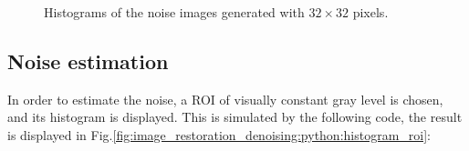 \begin{figure}[ht]
 \centering\caption{Histograms of the noise images generated with $32\times 32$ pixels.}%
 \hfill
 
 \hfill
 \label{fig:image_restoration_denoising:python:histograms}%
\end{figure}


\subsection{Noise estimation}
In order to estimate the noise, a ROI of visually constant gray level is chosen, and its histogram is displayed. This is simulated by the following code, the result is displayed in Fig.\ref{fig:image_restoration_denoising:python:histogram_roi}:

